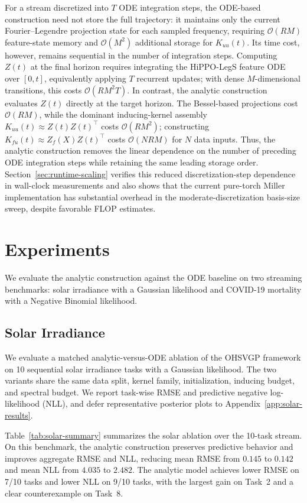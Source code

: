 \documentclass{article}
\theoremstyle{plain}
\theoremstyle{definition}
\theoremstyle{remark}
\begin{document}
For a stream discretized into $T$ ODE integration steps, the ODE-based construction need not store the full trajectory: it maintains only the current Fourier--Legendre projection state for each sampled frequency, requiring $\mathcal{O}(RM)$ feature-state memory and $\mathcal{O}(M^2)$ additional storage for $K_{uu}(t)$. Its time cost, however, remains sequential in the number of integration steps. Computing $Z(t)$ at the final horizon requires integrating the HiPPO-LegS feature ODE over $[0,t]$, equivalently applying $T$ recurrent updates; with dense $M$-dimensional transitions, this costs $\mathcal{O}(RM^2T)$. In contrast, the analytic construction evaluates $Z(t)$ directly at the target horizon. The Bessel-based projections cost $\mathcal{O}(RM)$, while the dominant inducing-kernel assembly $K_{uu}(t)\approx Z(t)Z(t)^\top$ costs $\mathcal{O}(RM^2)$; constructing $K_{fu}(t)\approx Z_f(X)Z(t)^\top$ costs $\mathcal{O}(NRM)$ for $N$ data inputs. Thus, the analytic construction removes the linear dependence on the number of preceding ODE integration steps while retaining the same leading storage order. Section~\ref{sec:runtime-scaling} verifies this reduced discretization-step dependence in wall-clock measurements and also shows that the current pure-torch Miller implementation has substantial overhead in the moderate-discretization basis-size sweep, despite favorable FLOP estimates.
\FloatBarrier

\section{Experiments}

We evaluate the analytic construction against the ODE baseline on two streaming benchmarks: solar irradiance with a Gaussian likelihood and COVID-19 mortality with a Negative Binomial likelihood.

\subsection{Solar Irradiance}

We evaluate a matched analytic-versus-ODE ablation of the OHSVGP framework on 10 sequential solar irradiance tasks with a Gaussian likelihood. The two variants share the same data split, kernel family, initialization, inducing budget, and spectral budget. We report task-wise RMSE and predictive negative log-likelihood (NLL), and defer representative posterior plots to Appendix~\ref{app:solar-results}.

Table~\ref{tab:solar-summary} summarizes the solar ablation over the 10-task stream. On this benchmark, the analytic construction preserves predictive behavior and improves aggregate RMSE and NLL, reducing mean RMSE from $0.145$ to $0.142$ and mean NLL from $4.035$ to $2.482$. The analytic model achieves lower RMSE on 7/10 tasks and lower NLL on 9/10 tasks, with the largest gain on Task~2 and a clear counterexample on Task~8.
\end{document}
